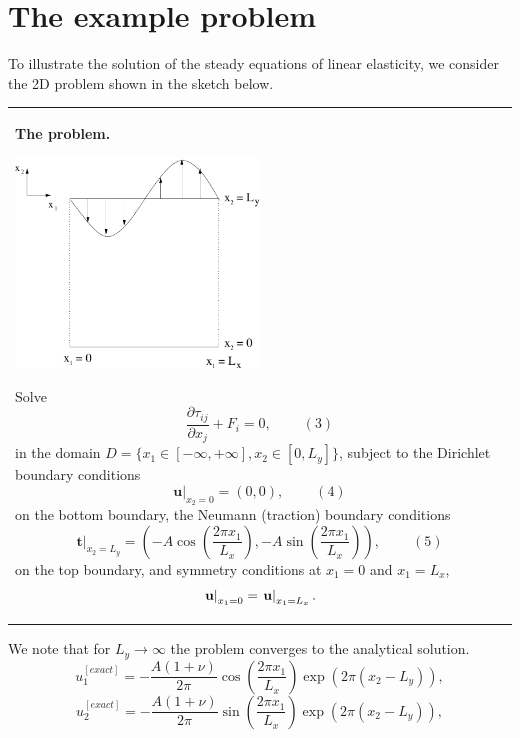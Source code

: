 \hypertarget{index_example}{}\section{The example problem}\label{index_example}
To illustrate the solution of the steady equations of linear elasticity, we consider the 2D problem shown in the sketch below.

\begin{center} \tabulinesep=1mm
\begin{longtabu} spread 0pt [c]{*{1}{|X[-1]}|}
\hline
\begin{center} {\bfseries The problem.} \end{center}   
\begin{DoxyImage}
\includegraphics[width=0.5\textwidth]{attempt3}
\end{DoxyImage}
 Solve \[ \frac{\partial \tau_{ij}}{\partial x_j} + F_i=0, \ \ \ \ \ \ \ \ \ \ (3) \] in the domain $ D = \{x_1 \in [-\infty,+\infty], x_2 \in [0,L_y]\} $, subject to the Dirichlet boundary conditions \[ \left. \mathbf{u}\right|_{x_2 = 0}=(0,0), \ \ \ \ \ \ \ \ \ \ (4) \] on the bottom boundary, the Neumann (traction) boundary conditions \[ \left. \mathbf{t}\right|_{x_2 = L_y}=\left(-A \cos{\left(\frac{2 \pi x_1}{L_x}\right)}, -A \sin{\left(\frac{2 \pi x_1}{L_x}\right)}\right), \ \ \ \ \ \ \ \ \ \ (5) \] on the top boundary, and symmetry conditions at $ x_1 = 0 $ and $ x_1 = L_x $, \[ \left. {\bf u}\right|_{x_1=0} = \left.{\bf u}\right|_{x_1=L_x}. \]   \\
\end{longtabu}
\end{center} 

We note that for $ L_y \to \infty $ the problem converges to the analytical solution. \[ u_1^{[exact]} = -\frac{A(1+\nu)}{2 \pi} \cos{\left(\frac{2 \pi x_1}{L_x}\right)} \exp{\left(2 \pi (x_2-L_y)\right)}, \] \[ u_2^{[exact]} = -\frac{A(1+\nu)}{2 \pi} \sin{\left(\frac{2 \pi x_1}{L_x}\right)} \exp{\left(2 \pi (x_2-L_y)\right)}, \]



